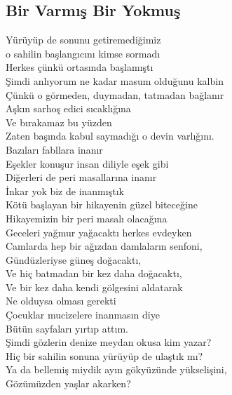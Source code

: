 \subsection{Bir Varmış Bir Yokmuş}

Yürüyüp de sonunu getiremediğimiz \\
o sahilin başlangıcını kimse sormadı \\
Herkes çünkü ortasında başlamıştı \\
Şimdi anlıyorum ne kadar masum olduğunu kalbin \\
Çünkü o görmeden, duymadan, tatmadan bağlanır \\
Aşkın sarhoş edici sıcaklığına \\
Ve bırakamaz bu yüzden \\
Zaten başında kabul saymadığı o devin varlığını. \\

\noindent\newline
Bazıları fabllara inanır \\
Eşekler konuşur insan diliyle eşek gibi \\
Diğerleri de peri masallarına inanır \\
İnkar yok biz de inanmıştık \\
Kötü başlayan bir hikayenin güzel biteceğine \\
Hikayemizin bir peri masalı olacağına \\

\noindent\newline
Geceleri yağmur yağacaktı herkes evdeyken \\
Camlarda hep bir ağızdan damlaların senfoni, \\
Gündüzleriyse güneş doğacaktı, \\
Ve hiç batmadan bir kez daha doğacaktı, \\
Ve bir kez daha kendi gölgesini aldatarak \\
Ne olduysa olması gerekti \\
Çocuklar mucizelere inanmasın diye \\
Bütün sayfaları yırtıp attım. \\

\noindent\newline
Şimdi gözlerin denize meydan okusa kim yazar? \\
Hiç bir sahilin sonuna yürüyüp de ulaştık mı? \\
Ya da bellemiş miydik ayın gökyüzünde yükselişini, \\
Gözümüzden yaşlar akarken? \\

